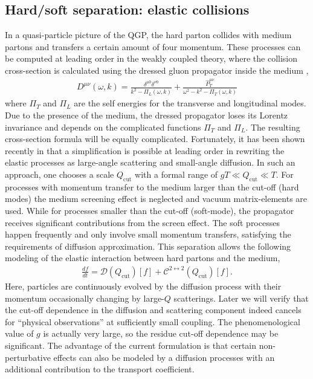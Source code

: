 \subsection{Hard/soft separation: elastic collisions}
In a quasi-particle picture of the QGP, the hard parton collides with medium partons and transfers a certain amount of four momentum.
These processes can be computed at leading order in the weakly coupled theory, where the collision cross-section is calculated using the dressed gluon propagator inside the medium \cite{PhysRevD.44.1298},
\begin{eqnarray}
D^{\mu\nu}(\omega, k) = \frac{\delta^{\mu 0}\delta^{\nu 0}}{k^2 - \Pi_L(\omega, k)} + \frac{\hat{P}_T^{\mu\nu}}{\omega^2 - k^2 - \Pi_T(\omega, k)}
\end{eqnarray}
where $\Pi_T$ and $\Pi_L$ are the self energies for the transverse and longitudinal modes.
Due to the presence of the medium, the dressed propagator loses its Lorentz invariance and depends on the complicated functions $\Pi_T$ and $\Pi_L$.
The resulting cross-section formula will be equally complicated.
Fortunately, it has been shown recently in \cite{Ghiglieri:2015ala} that a simplification is possible at leading order in rewriting the elastic processes as large-angle scattering and small-angle diffusion.
In such an approach, one chooses a scale $Q_\textrm{cut}$ with a formal range of $gT \ll Q_\textrm{cut} \ll T$.
For processes with momentum transfer to the medium larger than the cut-off  (hard modes) the medium screening effect is neglected and vacuum matrix-elements are used.
While for processes smaller than the cut-off (soft-mode), the propagator receives significant contributions from the screen effect.
The soft processes happen frequently and only involve small momentum transfers, satisfying the requirements of diffusion approximation.
This separation allows the following modeling of the elastic interaction between hard partons and the medium,
\begin{eqnarray}
\frac{df}{dt} = \mathcal{D}(Q_{\textrm{cut}})[f] + \mathcal{C}^{2\leftrightarrow 2}(Q_{\textrm{cut}})[f].
\end{eqnarray}
Here, particles are continuously evolved by the diffusion process with their momentum occasionally changing by large-$Q$ scatterings.
Later we will verify that the cut-off dependence in the diffusion and scattering component indeed cancels for ``physical observations'' at sufficiently small coupling.
The phenomenological value of $g$ is actually very large, so the residue cut-off dependence may be significant. 
The advantage of the current formulation is that certain non-perturbative effects can also be modeled by a diffusion processes with an additional contribution to the transport coefficient.

